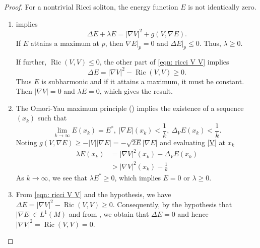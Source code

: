 \documentclass{amsart}
\newcommand{\abs}[1]{\left| #1 \right|}
\DeclareMathOperator*{\ricci}{Ric}
\theoremstyle{plain}
\theoremstyle{plain}
\theoremstyle{plain}
\theoremstyle{plain}
\theoremstyle{remark}
\begin{document}
\UpperBoundOnE*
\begin{proof}
For a nontrivial Ricci soliton, the energy function $E$ is not identically zero.
	\begin{enumerate}
		\item {} implies
	    		\begin{equation}\label{V}
    		    		\Delta E + \lambda E = \abs{\nabla V}^2 + g(V, \nabla E) .
    			\end{equation}
    			If $E$ attains a maximum at $p$, then $\nabla E |_p= 0$ and $\Delta E |_p \leq 0 $. Thus, $\lambda \geq 0$. 
    		
    			If further, $\ricci (V,V) \leq 0$, the other part of \cref{eqn: ricci V V} implies
    			$$ \Delta E = \abs{\nabla V}^2 - \ricci (V,V) \geq 0. $$
    			Thus $E$ is subharmonic and if it attains a maximum, it must be constant. 
    			Then
 		   	$\abs{\nabla V} = 0$ and $\lambda E =0$, which gives the result.
    		\item The Omori-Yau maximum principle () implies the existence of a sequence $(x_k)$ such that
    			\begin{equation*}
        			\lim_{k\to \infty} E(x_k) = E^*, ~ \abs{\nabla E} (x_k) < \frac{1}{k}, ~ \Delta_V E (x_k) < \frac{1}{k}.
	    		\end{equation*}
    			Noting $g(V,\nabla E) \geq -\abs{V}\abs{\nabla E} = -\sqrt{2E}\abs{\nabla E}$ and evaluating \cref{V} at $x_k$
    			\begin{align*}
        			\lambda E (x_k) &= \abs{\nabla V}^2 (x_k) - \Delta_V E (x_k) \\
            			&> \abs{\nabla V}^2 (x_k) - \frac{1}{k} %
	    		\end{align*}
    			As $k\to \infty$, we see that $\lambda E^* \geq 0 $, which implies $E=0$ or $\lambda \geq 0$. 
    		\item From \cref{eqn: ricci V V} and the hypothesis, we have $\Delta E = \abs{\nabla V}^2 - \ricci (V,V) \geq 0 $. 
 Consequently, by the hypothesis that  $\abs{\nabla E} \in L^{1}(M)$ and  from ,
 we obtain that  $\Delta E = 0$ and hence $\abs{\nabla V}^2 = \ricci(V,V) = 0 $. 
	\end{enumerate}
 \end{proof} 
\end{document}
